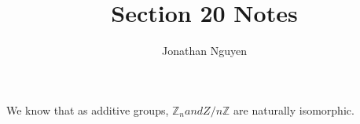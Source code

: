 \documentclass[11pt]{article}
\title{Section 20 Notes}
\author{Jonathan Nguyen}
\date{}
\begin{document}
\maketitle

We know that as additive groups, $\mathbb{Z}_n and Z/n\mathbb{Z}$ are naturally isomorphic. 
\end{document}
